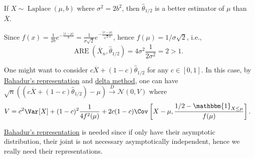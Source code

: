 \begin{eg}
	If \(X \sim \operatorname{Laplace}(\mu , b) \) where \(\sigma ^2 = 2b^2\), then \(\hat{\theta} _{1 / 2}\) is a better estimator of \(\mu \) than \(\overline{X} \).
\end{eg}
\begin{explanation}
	Since \(f(x) = \frac{1}{2b} e^{- \frac{\vert x - \mu \vert }{b}} = \frac{1}{\sigma \sqrt{2} } e^{- \frac{\vert x - \mu \vert }{\sqrt{2} \sigma }}\), hence \(f(\mu ) = 1 / \sigma \sqrt{2} \), i.e.,
	\[
		\operatorname{ARE}(\overline{X} _n, \hat{\theta} _{1 / 2})
		= 4 \sigma ^2 \frac{1}{2 \sigma ^2}
		= 2 > 1.
	\]
\end{explanation}

One might want to consider \(c \overline{X} + (1 - c)\hat{\theta} _{1 / 2}\) for any \(c \in [0, 1]\). In this case, by \hyperref[thm:Bahadur-representation]{Bahadur's representation} and \hyperref[thm:delta-method]{delta method}, one can have \(\sqrt{n} \left( (c \overline{X} + (1 - c)\hat{\theta} _{1 / 2}) - \mu \right) \overset{D}{\to} \mathcal{N} (0, V)\) where
\[
	V = c^2 \Var_{}[X] + (1 - c)^2 \frac{1}{4 f^2(\mu )} + 2c(1 - c) \Cov_{}\left[X - \mu , \frac{1 / 2 - \mathbbm{1}_{X \leq \mu } }{f(\mu )}\right].
\]

\begin{remark}
	\hyperref[thm:Bahadur-representation]{Bahadur's representation} is needed since if only have their asymptotic distribution, their joint is not necessary asymptotically independent, hence we really need their representations.
\end{remark}